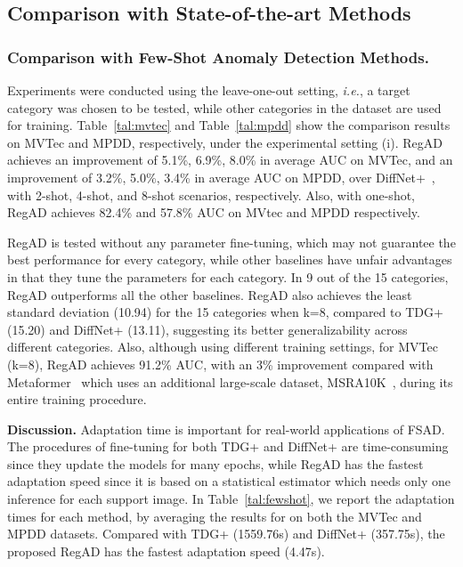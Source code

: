 \documentclass[runningheads]{llncs}
\begin{document}
\subsection{Comparison with State-of-the-art Methods}
\subsubsection{Comparison with Few-Shot Anomaly Detection Methods.} 
Experiments were conducted using the leave-one-out setting, \emph{i.e.}, a target category was chosen to be tested, while other categories in the dataset are used for training. Table~\ref{tal:mvtec} and Table~\ref{tal:mpdd} show the comparison results on MVTec and MPDD, respectively, under the experimental setting (i). RegAD achieves an improvement of 5.1\%, 6.9\%, 8.0\% in average AUC on MVTec, and an improvement of 3.2\%, 5.0\%, 3.4\% in average AUC on MPDD, over DiffNet+~\cite{DiffNet}, with 2-shot, 4-shot, and 8-shot scenarios, respectively. Also, with one-shot, RegAD achieves 82.4\% and 57.8\% AUC on MVtec and MPDD respectively.

RegAD is tested without any parameter fine-tuning, which may not guarantee the best performance for every category, while other baselines have unfair advantages in that they tune the parameters for each category. In 9 out of the 15 categories, RegAD outperforms all the other baselines. RegAD also achieves the least standard deviation (10.94) for the 15 categories when k=8, compared to TDG+ (15.20) and DiffNet+ (13.11), suggesting its better generalizability across different categories. Also, although using different training settings, for MVTec (k=8), RegAD achieves 91.2\% AUC, with an 3\% improvement compared with Metaformer~\cite{metaformer} which uses an additional large-scale dataset, MSRA10K~\cite{msra10k}, during its entire training procedure.

\textbf{Discussion.} Adaptation time is important for real-world applications of FSAD. The procedures of fine-tuning for both TDG+ and DiffNet+ are time-consuming since they update the models for many epochs, while RegAD has the fastest adaptation speed since it is based on a statistical estimator which needs only one inference for each support image. In Table~\ref{tal:fewshot}, we report the adaptation times for each method, by averaging the results for  on both the MVTec and MPDD datasets. Compared with TDG+ (1559.76s) and DiffNet+ (357.75s), the proposed RegAD has the fastest adaptation speed (4.47s).
\end{document}

